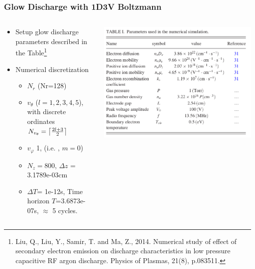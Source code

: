 \documentclass[mathserif, aspectratio=169]{beamer}
\newcommand{\vtheta}{{v_{\theta}}}
\newcommand{\vphi}{v_{\varphi}}
\DeclarePairedDelimiter\ceil{\lceil}{\rceil}
\begin{document}
\begin{frame}
	\frametitle{Glow Discharge with 1D3V Boltzmann}
	\begin{columns}
		\begin{column}{0.5\textwidth}
			\begin{itemize}
				\item Setup glow discharge parameters described in the Table\footnote[frame]{Liu, Q., Liu, Y., Samir, T. and Ma, Z., 2014. Numerical study of effect of secondary electron emission on discharge characteristics in low pressure capacitive RF argon discharge. Physics of Plasmas, 21(8), p.083511.}
				\item Numerical discretization
				\begin{itemize}
					\item $N_r$ (Nr=128)
					\item $\vtheta$ ($l=1,2,3,4,5$), with discrete ordinates $N_{\vtheta} = \ceil*{\frac{2l + 3}{2}}$ 
					\item $\vphi$ 1, (i.e. , $m=0$)
					\item $N_z=800$, $\Delta z$ = 3.1789e-03cm
					\item $\Delta T$= 1e-12s, Time horizon $T$=3.6873e-07s, $\approx$ 5 cycles.
				\end{itemize}
			\end{itemize}
			
		\end{column}
		\begin{column}{0.5\textwidth}
			\includegraphics[width=0.8\columnwidth]{glow_discharge_parameters.png}
		\end{column}
	\end{columns}
\end{frame}
\end{document}
